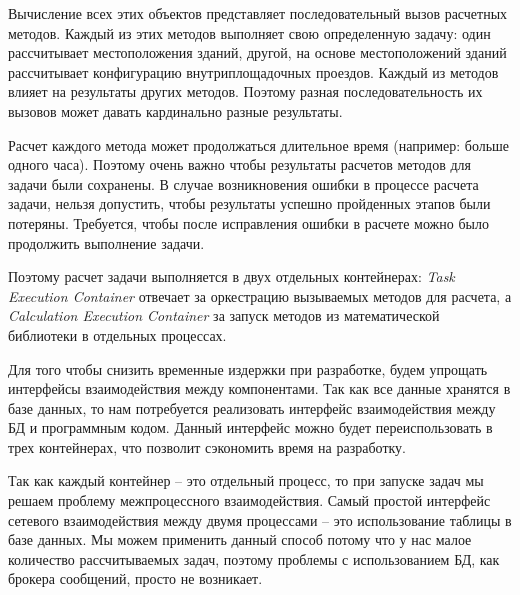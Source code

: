 Вычисление всех этих объектов представляет последовательный вызов расчетных методов.
Каждый из этих методов выполняет свою определенную задачу: один рассчитывает местоположения зданий, другой, на основе
местоположений зданий рассчитывает конфигурацию внутриплощадочных проездов. Каждый из методов влияет на
результаты других методов. Поэтому разная последовательность их вызовов может давать кардинально разные результаты.

Расчет каждого метода может продолжаться длительное время (например: больше одного часа). Поэтому очень важно
чтобы результаты расчетов методов для задачи были сохранены. В случае возникновения ошибки в процессе расчета задачи,
нельзя допустить, чтобы результаты успешно пройденных этапов были потеряны. Требуется, чтобы после исправления ошибки
в расчете можно было продолжить выполнение задачи.

Поэтому расчет задачи выполняется в двух отдельных контейнерах: \textit{Task Execution Container} отвечает за оркестрацию
вызываемых методов для расчета, а \textit{Calculation Execution Container} за запуск методов из математической библиотеки
в отдельных процессах.

Для того чтобы снизить временные издержки при разработке, будем упрощать интерфейсы взаимодействия между компонентами.
Так как все данные хранятся в базе данных, то нам потребуется реализовать интерфейс взаимодействия между БД
и программным кодом. Данный интерфейс можно будет переиспользовать в трех контейнерах, что позволит сэкономить время на
разработку.

Так как каждый контейнер -- это отдельный процесс, то при запуске задач мы решаем проблему межпроцессного взаимодействия.
Самый простой интерфейс сетевого взаимодействия между двумя процессами -- это использование таблицы в базе данных.
Мы можем применить данный способ потому что у нас малое количество рассчитываемых задач, поэтому проблемы
с использованием БД, как брокера сообщений, просто не возникает.
